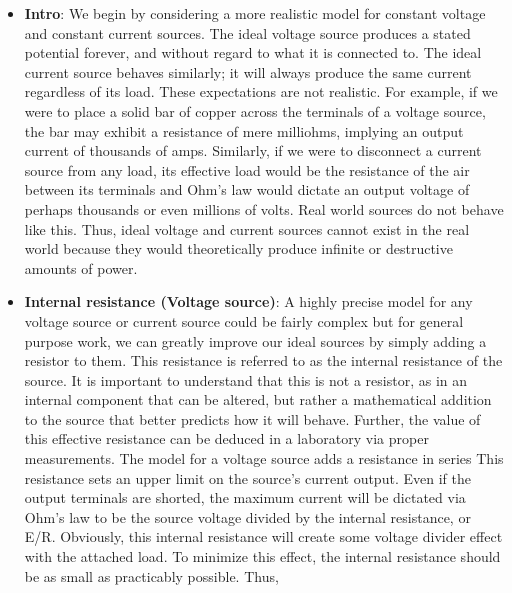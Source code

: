 \documentclass{report}
\begin{document}
    \pagebreak 
    \begin{itemize}
        \item \textbf{Intro}: We begin by considering a more realistic model for constant voltage and constant current sources. The ideal voltage source produces a stated potential forever, and without regard to what it is connected to. The ideal current source behaves similarly; it will always produce the same current regardless of its load. These expectations are not realistic. For example, if we were to place a solid bar of copper across the terminals of a voltage source, the bar may exhibit a resistance of mere milliohms, implying an output current of thousands of amps. Similarly, if we were to disconnect a current source from any load, its effective load would be the resistance of the air between its terminals and Ohm's law would dictate an output voltage of perhaps thousands or even millions of volts. Real world sources do not behave like this.          
            \bigbreak \noindent 
            Thus, ideal voltage and current sources cannot exist in the real world because they would theoretically produce infinite or destructive amounts of power.
        \item \textbf{Internal resistance (Voltage source)}: A highly precise model for any voltage source or current source could be fairly complex but for general purpose work, we can greatly improve our ideal sources by simply adding a resistor to them. This resistance is referred to as the internal resistance of the source.
            \bigbreak \noindent 
            It is important to understand that this is not a resistor, as in an internal component that can be altered, but rather a mathematical addition to the source that better predicts how it will behave. Further, the value of this effective resistance can be deduced in a laboratory via proper measurements.
            \bigbreak \noindent 
            The model for a voltage source adds a resistance in series
            \bigbreak \noindent 
            \bigbreak \noindent 
            This resistance sets an upper limit on the source's current output. Even if the output terminals are shorted, the maximum current will be dictated via Ohm's law to be the source voltage divided by the internal resistance, or E/R. Obviously, this internal resistance will create some voltage divider effect with the attached load. To minimize this effect, the internal resistance should be as small as practicably possible. Thus,

\end{itemize}
\end{document}
